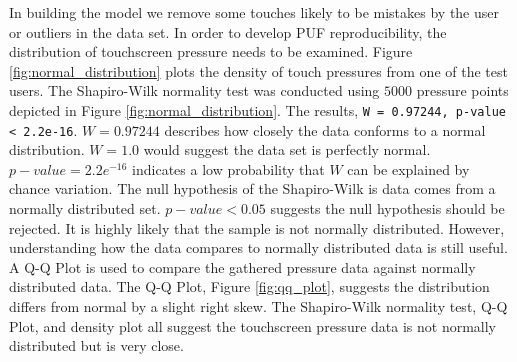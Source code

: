In building the model we remove some touches likely to be 
mistakes by the user or 
outliers in the data set.
%
%
In order to develop PUF reproducibility,
the distribution of touchscreen pressure needs to be examined.
%
Figure \ref{fig:normal_distribution} plots the density of 
touch pressures from one of the test users.
%
The Shapiro-Wilk normality test \cite{shapiro1965analysis} was conducted
using $5000$ pressure points depicted in
Figure \ref{fig:normal_distribution}.
%
The results, {\tt W = 0.97244, p-value < 2.2e-16}.
$W=0.97244$ describes how closely the data conforms to a normal distribution.
$W=1.0$ would suggest the data set is perfectly normal.
$p-value=2.2e^{-16}$ indicates a low probability that
$W$ can be explained by chance variation.
%
The null hypothesis of the Shapiro-Wilk is
data comes from a normally distributed set.
$p-value<0.05$ suggests the null hypothesis should be rejected.
It is highly likely that the sample is not normally distributed.
%
However,
understanding how the data compares to
normally distributed data is still useful.
A Q-Q Plot is used to compare the gathered pressure data
against normally distributed data.
%
The Q-Q Plot, Figure \ref{fig:qq_plot},
suggests the distribution differs from normal
by a slight right skew.
%
The Shapiro-Wilk normality test,
Q-Q Plot, 
and density plot
all suggest the touchscreen pressure data is not normally distributed 
but is very close.



